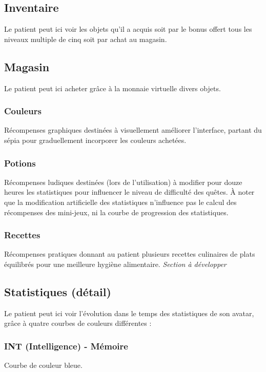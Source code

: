 \documentclass[a4paper,12pt,francais]{article}
\begin{document}
\subsection{Inventaire}
Le patient peut ici voir les objets qu'il a acquis soit par le bonus offert tous les niveaux multiple de cinq soit par achat au magasin.

\subsection{Magasin}

Le patient peut ici acheter grâce à la monnaie virtuelle divers objets.

\subsubsection{Couleurs}
Récompenses graphiques destinées à visuellement améliorer l'interface, partant du sépia pour graduellement incorporer les couleurs achetées.

\subsubsection{Potions}
Récompenses ludiques destinées (lors de l'utilisation) à modifier pour douze heures les statistiques pour influencer le niveau de difficulté des quêtes. À noter que la modification artificielle des statistiques n'influence pas le calcul des récompenses des mini-jeux, ni la courbe de progression des statistiques.

\subsubsection{Recettes}
Récompenses pratiques donnant au patient plusieurs recettes culinaires de plats équilibrés pour une meilleure hygiène alimentaire.
\emph{Section à développer}

\subsection{Statistiques (détail)}

Le patient peut ici voir l'évolution dans le temps des statistiques de son avatar, grâce à quatre courbes de couleurs différentes :

\subsubsection{INT (Intelligence) - Mémoire}
Courbe de couleur bleue.
\end{document}
